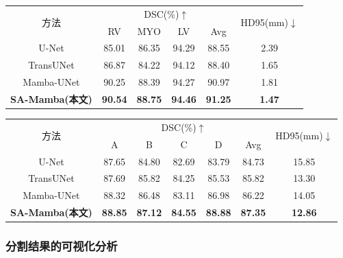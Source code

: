 \documentclass[12pt, a4paper, twoside]{article}
\begin{document}
\begin{table}[htbp]
    \centering
    \label{tab:acdc_sa}
    \begin{tabular}{cccccc}
        \toprule
        \multirow{2}{*}{方法} & \multicolumn{4}{c}{DSC(\%)$\uparrow$} & \multirow{2}{*}{HD95(mm)$\downarrow$} \\
        & RV & MYO & LV & Avg & \\
        \midrule
        U-Net & 85.01 & 86.35 & 94.29 & 88.55 & 2.39 \\
        TransUNet & 86.87 & 84.22 & 94.12 & 88.40 & 1.65 \\
        Mamba-UNet & 90.25 & 88.39 & 94.27 & 90.97 & 1.81 \\
        \midrule
        \textbf{SA-Mamba(本文)} & \textbf{90.54} & \textbf{88.75} & \textbf{94.46} & \textbf{91.25} & \textbf{1.47} \\
        \bottomrule
    \end{tabular}
\end{table}

\begin{table}[htbp]
    \centering
    \label{tab:mms_sa}
    \begin{tabular}{ccccccc}
        \toprule
        \multirow{2}{*}{方法} & \multicolumn{5}{c}{DSC(\%)$\uparrow$} & \multirow{2}{*}{HD95(mm)$\downarrow$} \\
        & A & B & C & D & Avg & \\
        \midrule
        U-Net & 87.65 & 84.80 & 82.69 & 83.79 & 84.73 & 15.85 \\
        TransUNet & 87.69 & 85.82 & 84.25 & 85.53 & 85.82 & 13.30 \\
        Mamba-UNet & 88.32 & 86.48 & 83.11 & 86.98 & 86.22 & 14.05 \\
        \midrule
        \textbf{SA-Mamba(本文)} & \textbf{88.85} & \textbf{87.12} & \textbf{84.55} & \textbf{88.88} & \textbf{87.35} & \textbf{12.86} \\
        \bottomrule
    \end{tabular}
\end{table}

\subsubsection{分割结果的可视化分析}
\end{document}
